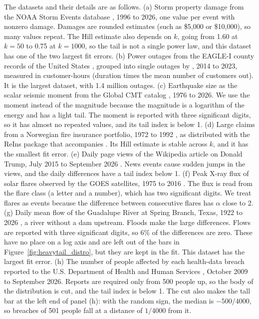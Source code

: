 \documentclass[twoside,11pt]{article}
\begin{document}
The datasets and their details are as follows. (a) Storm property damage from the NOAA Storm Events database \citep{nceiStormEventsDatabase2026}, 1996 to 2026, one value per event with nonzero damage. Damages are rounded estimates (such as \$5{,}000 or \$10{,}000), so many values repeat. The Hill estimate also depends on $k$, going from 1.60 at $k=50$ to 0.75 at $k=1000$, so the tail is not a single power law, and this dataset has one of the two largest fit errors. (b) Power outages from the EAGLE-I county records of the United States \citep{brelsfordDatasetRecordedElectricity2024}, grouped into single outages by \citet{sheEventcorrelatedOutageDataset2024}, 2014 to 2023, measured in customer-hours (duration times the mean number of customers out). It is the largest dataset, with 1.4 million outages. (c) Earthquake size as the scalar seismic moment from the Global CMT catalog \citep{dziewonskiDeterminationEarthquakeSource1981,ekstromGlobalCMTProject2012}, 1976 to 2026. We use the moment instead of the magnitude because the magnitude is a logarithm of the energy and has a light tail. The moment is reported with three significant digits, so it has almost no repeated values, and its tail index is below 1. (d) Large claims from a Norwegian fire insurance portfolio, 1972 to 1992 \citep{beirlantPracticalAnalysisExtreme1996}, as distributed with the ReIns package that accompanies \citet{albrecherReinsuranceActuarialStatistical2017}. Its Hill estimate is stable across $k$, and it has the smallest fit error. (e) Daily page views of the Wikipedia article on Donald Trump, July 2015 to September 2026 \citep{wikimediaPageviewsAPI2026}. News events cause sudden jumps in the views, and the daily differences have a tail index below 1. (f) Peak X-ray flux of solar flares observed by the GOES satellites, 1975 to 2016 \citep{nceiGOESXrayFlare2026}. The flux is read from the flare class (a letter and a number), which has two significant digits. We treat flares as events because the difference between consecutive flares has $\alpha$ close to 2. (g) Daily mean flow of the Guadalupe River at Spring Branch, Texas, 1922 to 2026 \citep{usgsWaterDataNation2026}, a river without a dam upstream. Floods make the large differences. Flows are reported with three significant digits, so 6\% of the differences are zero. These have no place on a log axis and are left out of the bars in Figure~\ref{fig:heavytail_distro}, but they are kept in the fit. This dataset has the largest fit error. (h) The number of people affected by each health-data breach reported to the U.S. Department of Health and Human Services \citep{hhsBreachPortal2026}, October 2009 to September 2026. Reports are required only from 500 people up, so the body of the distribution is cut, and the tail index is below 1. The cut also makes the tall bar at the left end of panel (h): with the random sign, the median is $-500/4000$, so breaches of 501 people fall at a distance of $1/4000$ from it.
\end{document}
